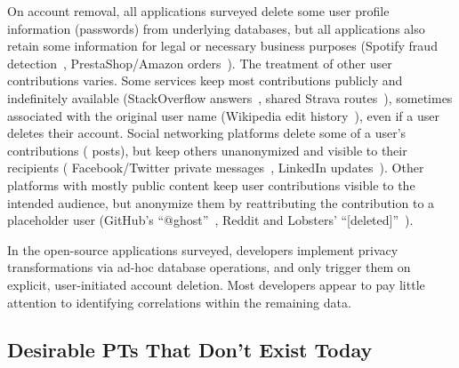 %
On account removal, all applications surveyed delete some user profile
information (\eg passwords) from underlying databases, but all applications
also retain some information for legal or necessary business purposes
(\eg Spotify fraud detection~\cite{spotify:privacy}, PrestaShop/Amazon
orders~\cite{amazon:privacy, prestashop:privacy}).
%
The treatment of other user contributions varies.
%
Some services keep most contributions publicly and indefinitely available (\eg StackOverflow
answers~\cite{stackoverflow:privacy}, shared Strava routes~\cite{strava:privacy}), sometimes
associated with the original user name (\eg Wikipedia edit history~\cite{wikipedia:privacy}), even
if a user deletes their account.
%
Social networking platforms delete some of a user's contributions (\eg
posts), but keep others unanonymized and visible to their recipients (\eg
Facebook/Twitter private messages~\cite{facebook:privacy, twitter:privacy},
LinkedIn updates~\cite{linkedin:privacy}).
%
Other platforms with mostly public content keep user contributions visible to the intended
audience, but anonymize them by reattributing the contribution to a placeholder user
(\eg GitHub's ``@ghost''~\cite{github:privacy}, Reddit and Lobsters'
``[deleted]''~\cite{reddit:privacy, lobsters:privacy}).
%
%

In the open-source applications surveyed, developers implement privacy transformations
via ad-hoc database operations, and only trigger them on explicit, user-initiated account
deletion.
%
Most developers appear to pay little attention to identifying correlations
within the remaining data.
%


\subsection{Desirable PTs That Don't Exist Today}

